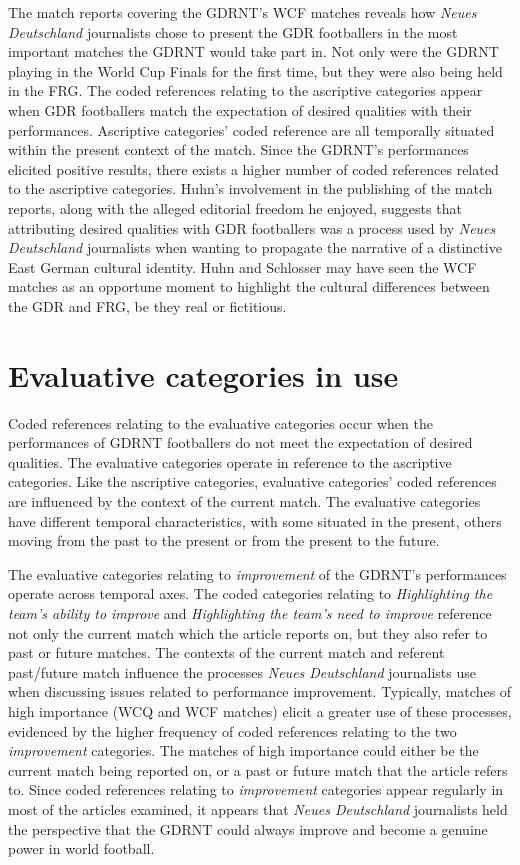 The match reports covering the GDRNT’s WCF matches reveals how \textit{Neues Deutschland} journalists chose to present the GDR footballers in the most important matches the GDRNT would take part in. Not only were the GDRNT playing in the World Cup Finals for the first time, but they were also being held in the FRG. The coded references relating to the ascriptive categories appear when GDR footballers match the expectation of desired qualities with their performances. Ascriptive categories’ coded reference are all temporally situated within the present context of the match. Since the GDRNT’s performances elicited positive results, there exists a higher number of coded references related to the ascriptive categories. Huhn’s involvement in the publishing of the match reports, along with the alleged editorial freedom he enjoyed, suggests that attributing desired qualities with GDR footballers was a process used by \textit{Neues Deutschland} journalists when wanting to propagate the narrative of a distinctive East German cultural identity. Huhn and Schlosser may have seen the WCF matches as an opportune moment to highlight the cultural differences between the GDR and FRG, be they real or fictitious.

\section*{Evaluative categories in use}

Coded references relating to the evaluative categories occur when the performances of GDRNT footballers do not meet the expectation of desired qualities. The evaluative categories operate in reference to the ascriptive categories. Like the ascriptive categories, evaluative categories’ coded references are influenced by the context of the current match. The evaluative categories have different temporal characteristics, with some situated in the present, others moving from the past to the present or from the present to the future.

The evaluative categories relating to \textit{improvement} of the GDRNT’s performances operate across temporal axes. The coded categories relating to \textit{Highlighting the team’s ability to improve} and \textit{Highlighting the team’s need to improve} reference not only the current match which the article reports on, but they also refer to past or future matches. The contexts of the current match and referent past/future match influence the processes \textit{Neues Deutschland} journalists use when discussing issues related to performance improvement. Typically, matches of high importance (WCQ and WCF matches) elicit a greater use of these processes, evidenced by the higher frequency of coded references relating to the two \textit{improvement} categories. The matches of high importance could either be the current match being reported on, or a past or future match that the article refers to. Since coded references relating to \textit{improvement} categories appear regularly in most of the articles examined, it appears that \textit{Neues Deutschland} journalists held the perspective that the GDRNT could always improve and become a genuine power in world football.

